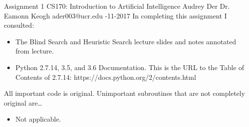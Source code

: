\documentclass{article}
\begin{document}
\begin{titlepage}
	\noindent Assignment 1 \hfill CS170: Introduction to Artificial Intelligence \newline \newline
	Audrey Der \hfill Dr. Eamonn Keogh  \newline
	ader003@ucr.edu -11-2017 \newline \newline \newline
	In completing this assignment I consulted:
	\begin{itemize}
		\item The Blind Search and Heuristic Search lecture slides and notes annotated from lecture.
        \item Python 2.7.14, 3.5, and 3.6 Documentation. This is the URL to the Table of Contents of 2.7.14:  https://docs.python.org/2/contents.html
	\end{itemize}
	All important code is original. Unimportant subroutines that are not completely original are\ldots
	\begin{itemize}
		\item Not applicable.
	\end{itemize}
\end{titlepage}
\end{document}
